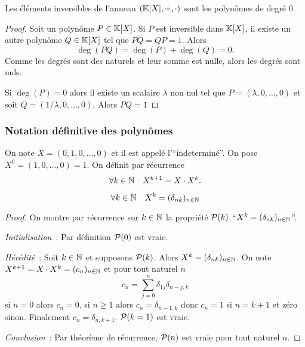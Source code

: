 \begin{prop}
  Les éléments inversibles de l'anneau $(\K[X],+,\cdot)$ sont les polynômes de degré $0$.
\end{prop}
\begin{proof}
  Soit un polynôme $P \in \K[X]$. Si $P$ est inversible dans $\K[X]$, il existe un autre polynôme $Q \in \K[X]$ tel que $PQ=QP=1$. Alors
  \begin{equation}
    \deg(PQ)=\deg(P)+\deg(Q)=0.
  \end{equation}
  Comme les degrés sont des naturels et leur somme est nulle, alors les degrés sont nuls.

  Si $\deg(P)=0$ alors il existe un scalaire $\lambda$ non nul tel que $P=(\lambda,0, \ldots, 0)$ et soit $Q=(1/\lambda, 0, \ldots, 0)$. Alors $PQ=1$
\end{proof}

\subsubsection{Notation définitive des polynômes}

On note $X = (0,1,0, \ldots, 0)$ et il est appelé l'``indeterminé''. On pose $X^0=(1,0, \ldots,0)=1$. On définit par récurrence
\begin{equation}
  \forall k \in \N \quad X^{k+1}=X \cdot X^k.
\end{equation}

\begin{lemme}
  \begin{equation}
    \forall k\in \N \quad X^k = (\delta_{nk})_{n \in \N}
  \end{equation}
\end{lemme}
\begin{proof}
  On montre par récurrence sur $k \in \N$ la propriété $\P(k)$ ``$X^k = (\delta_{nk})_{n \in \N}$''.

  \emph{Initialisation}~: Par définition $\P(0)$ est vraie.

  \emph{Hérédité}~: Soit $k \in \N$ et supposons $\P(k)$. Alors $X^k=(\delta_{nk})_{n \in \N}$. On note $X^{k+1}=X \cdot X^k=(c_n)_{n \in \N}$ et pour tout naturel $n$
  \begin{equation}
    c_n = \sum_{j=0}^n \delta_{1j} \delta_{n-j,k}
  \end{equation}
  si $n=0$ alors $c_n=0$, si $n \geq 1$ alors $c_n=\delta_{n-1,k}$ donc $c_n=1$ si $n=k+1$ et zéro sinon. Finalement $c_n=\delta_{n,k+1}$. $\P(k=1)$ est vraie.

  \emph{Conclusion}~: Par théorème de récurrence, $\P(n)$ est vraie pour tout naturel $n$.
\end{proof}

